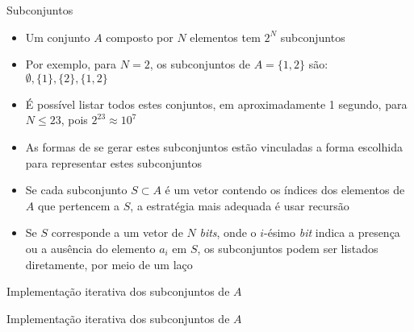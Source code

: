 \begin{frame}[fragile]{Subconjuntos}

    \begin{itemize}
        \item Um conjunto $A$ composto por $N$ elementos tem $2^N$ subconjuntos

        \item Por exemplo, para $N = 2$, os subconjuntos de $A = \lbrace 1, 2\rbrace$ são:
            $\emptyset, \lbrace 1\rbrace, \lbrace 2\rbrace, \lbrace 1, 2\rbrace$

        \item É possível listar todos estes conjuntos, em aproximadamente 1 segundo, para
            $N\leq 23$, pois $2^{23} \approx 10^7$

        \item As formas de se gerar estes subconjuntos estão vinculadas a forma escolhida para
            representar estes subconjuntos

        \item Se cada subconjunto $S\subset A$ é um vetor contendo os índices dos elementos de
            $A$ que pertencem a $S$, a estratégia mais adequada é usar recursão

        \item Se $S$ corresponde a um vetor de $N$ \textit{bits}, onde o $i$-ésimo \textit{bit}
            indica a presença ou a ausência do elemento $a_i$ em $S$, os subconjuntos podem ser
            listados diretamente, por meio de um laço 
    \end{itemize}

\end{frame}

\begin{frame}[fragile]{Implementação iterativa dos subconjuntos de $A$}
\end{frame}

\begin{frame}[fragile]{Implementação iterativa dos subconjuntos de $A$}
\end{frame}

